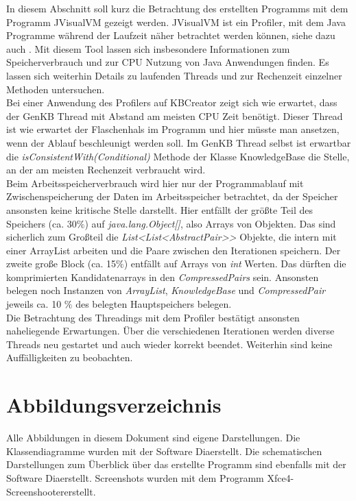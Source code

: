 \documentclass[12pt,a4paper]{article}
\begin{document}
In diesem Abschnitt soll kurz die Betrachtung des erstellten Programms mit dem Programm JVisualVM gezeigt werden. JVisualVM ist ein Profiler, mit dem Java Programme während der Laufzeit näher betrachtet werden können, siehe dazu auch \cite{jvis20}. Mit diesem Tool lassen sich insbesondere Informationen zum Speicherverbrauch und zur CPU Nutzung von Java Anwendungen finden. Es lassen sich weiterhin Details zu laufenden Threads und zur Rechenzeit einzelner Methoden untersuchen. \\
Bei einer Anwendung des Profilers auf KBCreator zeigt sich wie erwartet, dass der GenKB Thread mit Abstand am meisten CPU Zeit benötigt. Dieser Thread ist wie erwartet der Flaschenhals im Programm und hier müsste man ansetzen, wenn der Ablauf beschleunigt werden soll. Im GenKB Thread selbst ist erwartbar die \textit{isConsistentWith(Conditional)} Methode der Klasse KnowledgeBase die Stelle, an der am meisten Rechenzeit verbraucht wird. \\
Beim Arbeitsspeicherverbrauch wird hier nur der Programmablauf mit Zwischenspeicherung der Daten im Arbeitsspeicher betrachtet, da der Speicher ansonsten keine kritische Stelle darstellt. Hier entfällt der größte Teil des Speichers (ca. 30$\%$) auf \textit{java.lang.Object[]}, also Arrays von Objekten. Das sind sicherlich zum Großteil die \textit{List<List<AbstractPair>>} Objekte, die intern mit einer ArrayList arbeiten und die Paare zwischen den Iterationen speichern. Der zweite große Block (ca. 15$\%$) entfällt auf Arrays von \textit{int} Werten. Das dürften die komprimierten Kandidatenarrays in den \textit{CompressedPairs} sein. Ansonsten belegen noch Instanzen von \textit{ArrayList}, \textit{KnowledgeBase} und \textit{CompressedPair} jeweils ca. 10 $\%$ des belegten Hauptspeichers belegen. \\
Die Betrachtung des Threadings mit dem Profiler bestätigt ansonsten naheliegende Erwartungen. Über die verschiedenen Iterationen werden diverse Threads neu gestartet und auch wieder korrekt beendet. Weiterhin sind keine Auffälligkeiten zu beobachten.




\newpage

\section*{Abbildungsverzeichnis}
Alle Abbildungen in diesem Dokument sind eigene Darstellungen. Die Klassendiagramme wurden mit der Software \glqq Dia\grqq \space erstellt. Die schematischen Darstellungen zum Überblick über das erstellte Programm sind ebenfalls mit der Software \glqq Dia\grqq \space erstellt. Screenshots  wurden mit dem Programm \glqq Xfce4-Screenshooter\grqq \space erstellt.
 
\end{document}
